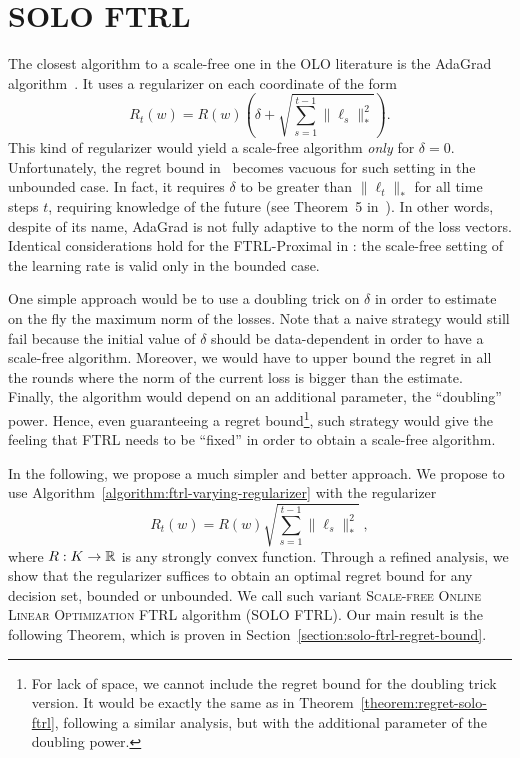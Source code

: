 \section{SOLO FTRL}
\label{section:solo-ftrl}

The closest algorithm to a scale-free one in the OLO literature is the AdaGrad
algorithm~\cite{Duchi-Hazan-Singer-2011}.  It uses a regularizer on each
coordinate of the form
\begin{equation*}
R_t(w) = R(w) \left(\delta + \sqrt{\sum_{s=1}^{t-1} \|\ell_s\|_*^2} \right).
\end{equation*}
This kind of regularizer would yield a scale-free algorithm \emph{only} for
$\delta=0$.  Unfortunately, the regret bound in~\cite{Duchi-Hazan-Singer-2011}
becomes vacuous for such setting in the unbounded case. In fact, it requires
$\delta$ to be greater than $\|\ell_t\|_*$ for all time steps $t$, requiring
knowledge of the future (see Theorem~5 in~\cite{Duchi-Hazan-Singer-2011}). In
other words, despite of its name, AdaGrad is not fully adaptive to the norm of
the loss vectors. Identical considerations hold for the FTRL-Proximal in
\cite{McMahan-Streeter-2010,McMahan-2014}: the scale-free setting of the learning rate is
valid only in the bounded case.

One simple approach would be to use a doubling trick on $\delta$ in order to
estimate on the fly the maximum norm of the losses. Note that a naive strategy
would still fail because the initial value of $\delta$ should be data-dependent
in order to have a scale-free algorithm. Moreover, we would have to upper bound
the regret in all the rounds where the norm of the current loss is bigger than
the estimate. Finally, the algorithm would depend on an additional parameter,
the ``doubling'' power. Hence, even guaranteeing a regret bound\footnote{For
lack of space, we cannot include the regret bound for the doubling trick
version. It would be exactly the same as in
Theorem~\ref{theorem:regret-solo-ftrl}, following a similar analysis, but with
the additional parameter of the doubling power.}, such strategy would give the
feeling that FTRL needs to be ``fixed'' in order to obtain a scale-free
algorithm.

In the following, we propose a much simpler and better approach.  We propose to
use Algorithm~\ref{algorithm:ftrl-varying-regularizer} with the regularizer
\begin{equation*}
R_t(w) = R(w) \sqrt{\sum_{s=1}^{t-1} \|\ell_s\|_*^2} \; ,
\end{equation*}
where $R:K \to \mathbb{R}$ is any strongly convex function. Through a refined analysis,
we show that the regularizer suffices to obtain an optimal regret bound for any
decision set, bounded or unbounded.  We call such variant \textsc{Scale-free
Online Linear Optimization FTRL} algorithm (\textsc{SOLO FTRL}).  Our main
result is the following Theorem, which is proven in
Section~\ref{section:solo-ftrl-regret-bound}.

